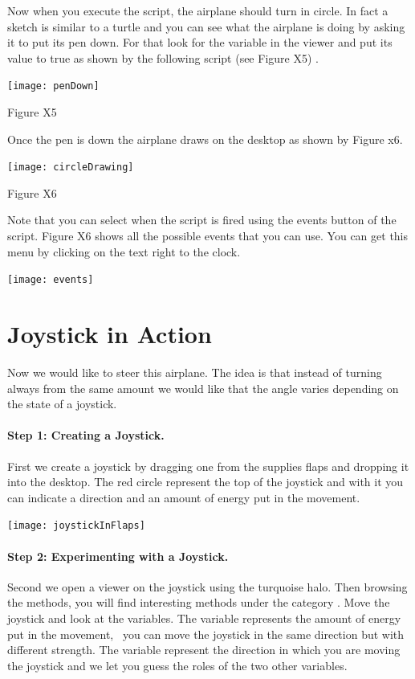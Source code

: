 Now when you execute the script, the airplane should turn in circle. In fact a sketch is similar to a turtle and you can see what the airplane is doing by asking it to put its pen down. For that look for the variable  in the viewer and put its value to true as shown by the following script (see Figure X5)
.
\begin{center}\texttt{[image: penDown]}\end{center}
Figure X5

Once the pen is down the airplane draws on the desktop as shown by Figure x6.
\begin{center}\texttt{[image: circleDrawing]}\end{center}
Figure X6

Note that you can select when the script is fired using the events button of the script. Figure X6 shows all the possible events that you can use. You can get this menu by clicking on the text right to the clock. 
\begin{center}\texttt{[image: events]}\end{center}


\section{Joystick in Action}
Now we would like to steer this airplane. The idea is that instead of turning always from the same amount we would like that the angle varies depending on the state of a joystick. 

\paragraph{Step 1: Creating a Joystick.}
First we create a joystick by dragging one from the supplies flaps and dropping it into the desktop. The red circle represent the top of the joystick and with it you can indicate a direction and an amount of energy put in the movement.
\begin{center}\texttt{[image: joystickInFlaps]}\end{center}

\paragraph{Step 2: Experimenting with  a Joystick.}
Second we open a viewer on the joystick using the turquoise halo. Then browsing the methods, you will find interesting methods under the category .  Move the joystick and look at the variables. The variable  represents the amount of energy put in the movement, \ie\ you can move the joystick in the same direction but with different strength. The variable  represent the direction in which you are moving the joystick and we let you guess the roles of the two other variables. 

